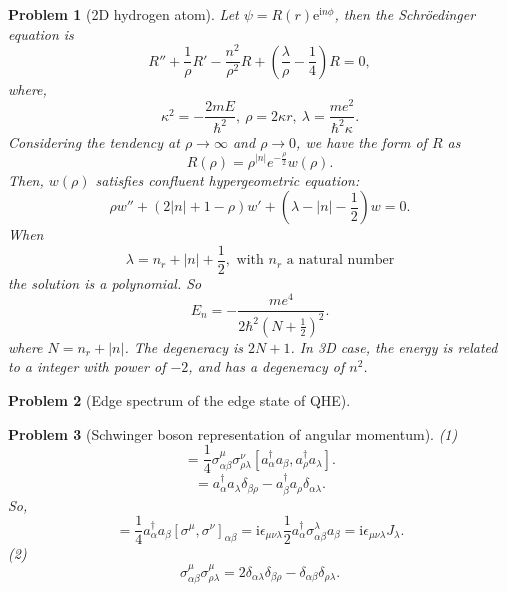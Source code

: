\documentclass{article}
\theoremstyle{1}
\newtheorem{problem}{Problem}
\newcommand{\ii}{\mathrm{i}}
\newcommand{\ee}{\mathrm{e}}
\begin{document}
\begin{problem}[2D hydrogen atom]
Let $\psi=R(r)\ee ^{\ii n \phi}$, then the Schröedinger equation is
\begin{equation}
    R''+\frac{1}{\rho}R'-\frac{n^2}{\rho^2}R+\left(\frac{\lambda}{\rho}-\frac{1}{4}\right)R=0,
\end{equation}
where,
\begin{equation}
    \kappa^2=-\frac{2mE}{\hbar^2},\ \rho=2\kappa r,\ \lambda=\frac{me^2}{\hbar^2 \kappa}.
\end{equation}
Considering the tendency at $\rho\rightarrow\infty$ and $\rho\rightarrow 0$, we have the form of $R$ as
\begin{equation}
    R(\rho)=\rho^{|n|}e^{-\frac{\rho}{2}}w(\rho).
\end{equation}
Then, $w(\rho)$ satisfies confluent hypergeometric equation:
\begin{equation}
    \rho w''+\left(2|n|+1-\rho\right)w'+\left(\lambda-|n|-\frac{1}{2}\right)w=0.
\end{equation}
When
\begin{equation}
    \lambda=n_r+|n|+\frac{1}{2}, \text{ with } n_r \text{ a natural number}
\end{equation}
the solution is a polynomial. So 
\begin{equation}
    E_n= -\frac{me^4}{2\hbar^2\left(N+\frac{1}{2}\right)^2}.
\end{equation}
where $N=n_r+|n|$. The degeneracy is $2N+1$. In 3D case, the energy is related to a integer with power of $-2$, and has a degeneracy of $n^2$.
\end{problem}
\begin{problem}[Edge spectrum of the edge state of QHE]
    
\end{problem}
\begin{problem}[Schwinger boson representation of angular momentum]
    (1) 
    \begin{equation}
        [J_\mu,J_\nu]=\frac{1}{4}\sigma_{\alpha\beta}^{\mu}\sigma_{\rho\lambda}^{\nu}[a_\alpha^\dagger a_\beta,a_\rho^\dagger a_\lambda].
    \end{equation}
    \begin{equation}
        [a\alpha^\dagger a_\beta,a_\rho^\dagger a_\lambda]=a_\alpha^\dagger a_\lambda\delta_{\beta\rho}-a_\beta^\dagger a_\rho\delta_{\alpha\lambda}.
    \end{equation}
    So,
    \begin{equation}
        [J_\mu,J_\nu]=\frac{1}{4}a_\alpha^\dagger a_\beta[\sigma^\mu,\sigma^\nu]_{\alpha\beta}=\ii\epsilon_{\mu\nu\lambda}\frac{1}{2}a_\alpha^\dagger \sigma_{\alpha\beta}^\lambda a_\beta=\ii \epsilon_{\mu\nu\lambda}J_\lambda .
    \end{equation}
    (2) 
    \begin{equation}
        \sigma_{\alpha\beta}^\mu\sigma_{\rho\lambda}^\mu=2\delta_{\alpha\lambda}\delta_{\beta\rho}-\delta_{\alpha\beta}\delta_{\rho\lambda}.
    \end{equation}
\end{problem}
\end{document}
